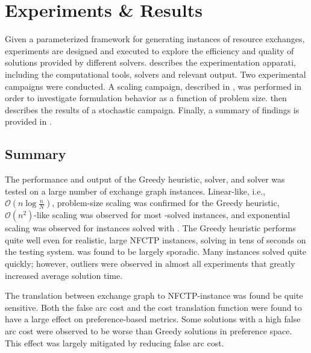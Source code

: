 \chapter{Experiments \& Results}\label{ch:results}

Given a parameterized framework for generating instances of resource exchanges,
experiments are designed and executed to explore the efficiency and quality of
solutions provided by different solvers.  describes the
experimentation apparati, including the computational tools, solvers and
relevant output. Two experimental campaigns were conducted. A scaling campaign,
described in , was performed in order to investigate
formulation behavior as a function of problem size. 
then describes the results of a stochastic campaign. Finally, a summary of
findings is provided in .







\section{Summary}\label{results:sum}

The performance and output of the Greedy heuristic, \clp solver, and \cbc solver
was tested on a large number of exchange graph instances. Linear-like, i.e.,
$\mathcal{O}(n\log{}\frac{n}{N})$, problem-size scaling was confirmed for the
Greedy heuristic, $\mathcal{O}(n^2)$-like scaling was observed for most
\clp-solved instances, and exponential scaling was observed for instances solved
with \cbc. The Greedy heuristic performs quite well even for realistic, large
NFCTP instances, solving in tens of seconds on the testing system. \cbc was
found to be largely sporadic. Many instances solved quite quickly; however,
outliers were observed in almost all experiments that greatly increased average
solution time. 

The translation between exchange graph to NFCTP-instance was found be quite
sensitive. Both the false arc cost and the cost translation function were found
to have a large effect on preference-based metrics. Some \cbc solutions with a
high false arc cost were observed to be worse than Greedy solutions in
preference space. This effect was largely mitigated by reducing false arc
cost. 

